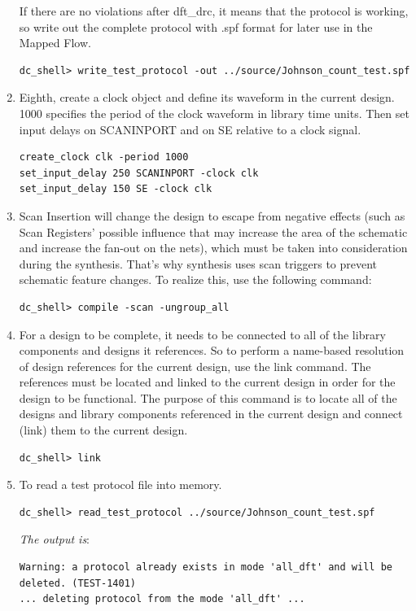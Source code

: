 \documentclass[a4paper,12pt,twoside]{article}
\begin{document}
\begin{enumerate}
\begin{figure}[H]
    \end{figure}
    If there are no violations after dft\_drc, it means that the protocol is working, so write out the complete protocol with .spf format for later use in the Mapped Flow.
    \begin{verbatim}
dc_shell> write_test_protocol -out ../source/Johnson_count_test.spf
    \end{verbatim}
    \item Eighth, create a clock object and define its waveform in the current design. 1000 specifies the period of the clock waveform in library time units. Then set input delays on SCANINPORT and on SE relative to a clock signal.
    \begin{verbatim}
create_clock clk -period 1000
set_input_delay 250 SCANINPORT -clock clk
set_input_delay 150 SE -clock clk
    \end{verbatim}
    \item Scan Insertion will change the design to escape from negative effects (such as Scan Registers' possible influence that may increase the area of the schematic and increase the fan-out on the nets), which must be taken into consideration during the synthesis. That's why synthesis uses scan triggers to prevent schematic feature changes. To realize this, use the following command:
    \begin{verbatim}
dc_shell> compile -scan -ungroup_all
    \end{verbatim}
    \item For a design to be complete, it needs to be connected to all of the library components and designs it references. So to perform a name-based resolution of design references for the current design, use the link command. The references must be located and linked to the current design in order for the design to be functional. The purpose of this command is to locate all of the designs and library components referenced in the current design and connect (link) them to the current design.
    \begin{verbatim}
dc_shell> link
    \end{verbatim}
    \item To read a test protocol file into memory.
    \begin{verbatim}
dc_shell> read_test_protocol ../source/Johnson_count_test.spf
    \end{verbatim}
    \textit{The output is}:
    \begin{verbatim}
Warning: a protocol already exists in mode 'all_dft' and will be deleted. (TEST-1401)
... deleting protocol from the mode 'all_dft' ...


\end{verbatim}
\end{enumerate}
\end{document}
